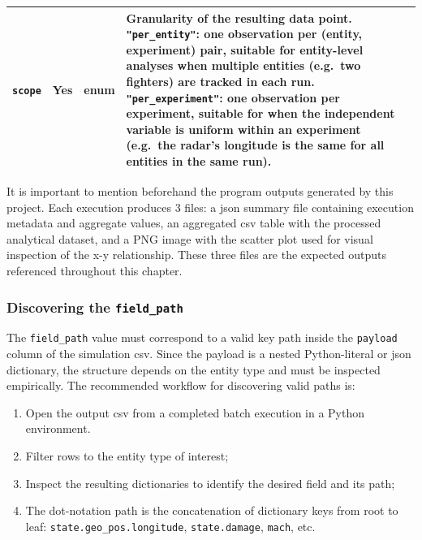 \begin{table}[htbp]
\begin{tabularx}{\linewidth}{l l l >{\raggedright\arraybackslash}X}
\addlinespace
\texttt{scope} & Yes & enum & Granularity of the resulting data point. \texttt{"per\_entity"}: one observation per (entity, experiment) pair, suitable for entity-level analyses when multiple entities (e.g.\ two fighters) are tracked in each run. \texttt{"per\_experiment"}: one observation per experiment, suitable for when the independent variable is uniform within an experiment (e.g.\ the radar's longitude is the same for all entities in the same run). \\
\bottomrule
\end{tabularx}
\end{table}

It is important to mention beforehand the program outputs generated by this project. Each
execution produces 3 files: a \gls{json} summary file containing execution metadata and
aggregate values, an aggregated \gls{csv} table with the processed analytical dataset,
and a PNG image with the scatter plot used for visual inspection of the x-y relationship.
These three files are the expected outputs referenced throughout this chapter.

\subsubsection{Discovering the \texttt{field\_path}}
\label{subsec:fieldpath-discovery}

The \texttt{field\_path} value must correspond to a valid key path inside the \texttt{payload}
column of the simulation \gls{csv}.  Since the payload is a nested Python-literal or \gls{json}
dictionary, the structure depends on the entity type and must be inspected empirically.  The
recommended workflow for discovering valid paths is:

\begin{enumerate}
    \item Open the output \gls{csv} from a completed batch execution  in a Python environment.
    \item Filter rows to the entity type of interest;
    \item Inspect the resulting dictionaries to identify the desired field and its path;
    \item The dot-notation path is the concatenation of dictionary keys from root to leaf:
          \texttt{state.geo\_pos.longitude}, \texttt{state.damage}, \texttt{mach}, etc.
\end{enumerate}

